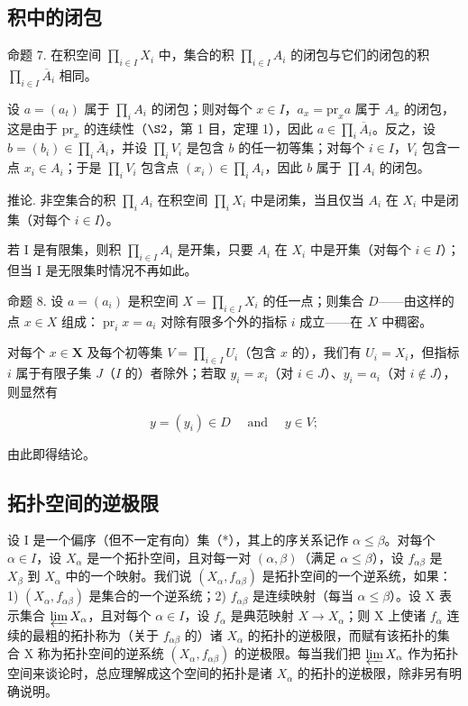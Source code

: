 \subsection{积中的闭包}

命题 7. 在积空间 \(\prod_{i\in I}X_i\) 中，集合的积 \(\prod_{i\in I}A_i\) 的闭包与它们的闭包的积 \(\prod_{i\in I}\overline{A}_i\) 相同。

设 \(a = (a_{t})\) 属于 \(\prod_{i} A_{i}\) 的闭包；则对每个 \(x \in I\)，\(a_{x} = \text{pr}_{x} a\) 属于 \(A_{x}\) 的闭包，这是由于 \(\text{pr}_{x}\) 的连续性（\(\S 2\)，第 1 目，定理 1），因此 \(a \in \prod_{i} \overline{A}_{i}\)。反之，设 \(b = (b_{i}) \in \prod_{i} \overline{A}_{i}\)，并设 \(\prod_{i} V_{i}\) 是包含 \(b\) 的任一初等集；对每个 \(i \in I\)，\(V_{i}\) 包含一点 \(x_{i} \in A_{i}\)；于是 \(\prod_{i} V_{i}\) 包含点 \((x_{i}) \in \prod_{i} A_{i}\)，因此 \(b\) 属于 \(\prod A_{i}\) 的闭包。

推论. 非空集合的积 \(\prod_{i} A_{i}\) 在积空间 \(\prod_{i} X_{i}\) 中是闭集，当且仅当 \(A_{i}\) 在 \(X_{i}\) 中是闭集（对每个 \(i \in I\)）。

若 I 是有限集，则积 \(\prod_{i\in I}A_i\) 是开集，只要 \(A_i\) 在 \(X_i\) 中是开集（对每个 \(i\in I\)）；但当 I 是无限集时情况不再如此。

命题 8. 设 \(a = (a_{i})\) 是积空间 \(X = \prod_{i \in I} X_{i}\) 的任一点；则集合 \(D\)——由这样的点 \(x \in X\) 组成：\(\operatorname{pr}_{i} x = a_{i}\) 对除有限多个外的指标 \(i\) 成立——在 \(X\) 中稠密。

对每个 \(x \in \mathbf{X}\) 及每个初等集 \(V = \prod_{i \in I} U_i\)（包含 \(x\) 的），我们有 \(U_i = X_i\)，但指标 \(i\) 属于有限子集 \(J\)（\(I\) 的）者除外；若取 \(y_i = x_i\)（对 \(i \in J\)）、\(y_i = a_i\)（对 \(i \notin J\)），则显然有

\[
y = (y _ {i}) \in D \quad \text { and } \quad y \in V;
\]

由此即得结论。

\subsection{拓扑空间的逆极限}

设 I 是一个偏序（但不一定有向）集（*），其上的序关系记作 \(\alpha \leqslant \beta\)。对每个 \(\alpha \in I\)，设 \(X_{\alpha}\) 是一个拓扑空间，且对每一对 \((\alpha, \beta)\)（满足 \(\alpha \leqslant \beta\)），设 \(f_{\alpha\beta}\) 是 \(X_{\beta}\) 到 \(X_{\alpha}\) 中的一个映射。我们说 \((X_{\alpha}, f_{\alpha\beta})\) 是拓扑空间的一个逆系统，如果：1) \((X_{\alpha}, f_{\alpha\beta})\) 是集合的一个逆系统；2) \(f_{\alpha\beta}\) 是连续映射（每当 \(\alpha \leqslant \beta\)）。设 X 表示集合 \(\varprojlim X_{\alpha}\)，且对每个 \(\alpha \in I\)，设 \(f_{\alpha}\) 是典范映射 \(X \to X_{\alpha}\)；则 X 上使诸 \(f_{\alpha}\) 连续的最粗的拓扑称为（关于 \(f_{\alpha\beta}\) 的）诸 \(X_{\alpha}\) 的拓扑的逆极限，而赋有该拓扑的集合 X 称为拓扑空间的逆系统 \((X_{\alpha}, f_{\alpha\beta})\) 的逆极限。每当我们把 \(\varprojlim X_{\alpha}\) 作为拓扑空间来谈论时，总应理解成这个空间的拓扑是诸 \(X_{\alpha}\) 的拓扑的逆极限，除非另有明确说明。

